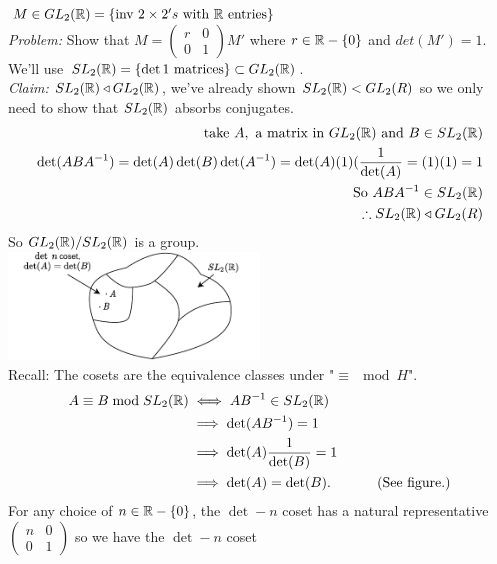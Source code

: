 \begin{example}
$M\in GL_2({\mathbb{ R}})= \{\text{inv }2\times 2's \text{ with }{\mathbb{ R}} \text{ entries}\}$\steezybreak\\
\textit{Problem:} Show that $M=\begin{pmatrix}
r & 0 \\
0 & 1
\end{pmatrix}M'$ where $r\in {\mathbb{ R}}-\{0\}$ and $det(M')=1$.\steezybreak\\
We'll use $SL_2({\mathbb{ R}})=\{\det 1 \text{ matrices}\}\subset GL_2({\mathbb{ R}})$.\steezybreak\\
\textit{Claim:} $SL_2({\mathbb{ R}})\triangleleft GL_2({\mathbb{ R}})$, we've already shown $SL_2({\mathbb{ R}})<GL_2(R)$ so we only need to show that $SL_2({\mathbb{ R}})$ absorbs conjugates.
\begin{align}
    \text{take }A, \text{ a matrix in } GL_2({\mathbb{ R}}) \text{ and } B \in SL_2({\mathbb{ R}})\nonumber\\
    \det(ABA^{-1})=\det(A)\det(B)\det(A^{-1})=\det(A)(1)(\frac{1}{\det(A)}= (1)(1)=1 \nonumber \\
    \text{So } ABA^{-1}\in SL_2({\mathbb{ R}}) \nonumber \\
    \therefore SL_2({\mathbb{ R}}) \triangleleft GL_2(R) \nonumber 
\end{align}
So $GL_2({\mathbb{ R}})/SL_2({\mathbb{ R}})$ is a group.\steezybreak\\
\includegraphics[width=0.5\textwidth]{Figures/aside_sl2(R).pdf}\steezybreak\\
Recall: The cosets are the equivalence classes under "$\equiv \mod H$".
\begin{align}
    A\equiv B \bmod SL_2({\mathbb{ R}}) &\iff AB^{-1}\in SL_2({\mathbb{ R}}) \nonumber \\
    &\implies \det(AB^{-1})=1 \nonumber \\
    &\implies \det(A)\frac{1}{\det(B)}=1 \nonumber\\
    &\implies \det(A)=\det(B). \ \ \ \ \ \ \ \ \ \text{ (See figure.)}\nonumber 
\end{align}
For any choice of $n\in {\mathbb{ R}}-\{0\}$, the $\det -n$ coset has a natural representative $\begin{pmatrix}
n & 0 \\
0 & 1
\end{pmatrix}$ so we have the $\det-n$ coset

\end{example}
